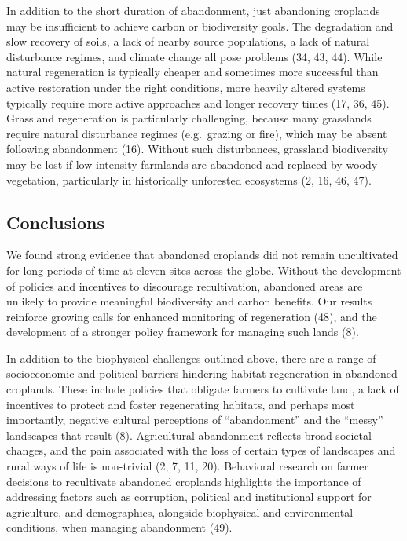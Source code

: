 \documentclass[9pt,twocolumn,twoside,lineno]{pnas-new}
\begin{document}
In addition to the short duration of abandonment, just abandoning croplands may be insufficient to achieve carbon or biodiversity goals.
The degradation and slow recovery of soils, a lack of nearby source populations, a lack of natural disturbance regimes, and climate change all pose problems (34, 43, 44).
While natural regeneration is typically cheaper and sometimes more successful than active restoration under the right conditions, more heavily altered systems typically require more active approaches and longer recovery times (17, 36, 45).
Grassland regeneration is particularly challenging, because many grasslands require natural disturbance regimes (e.g.~grazing or fire), which may be absent following abandonment (16).
Without such disturbances, grassland biodiversity may be lost if low-intensity farmlands are abandoned and replaced by woody vegetation, particularly in historically unforested ecosystems (2, 16, 46, 47).

\hypertarget{conclusions}{%
\subsection{Conclusions}\label{conclusions}}

We found strong evidence that abandoned croplands did not remain uncultivated for long periods of time at eleven sites across the globe.
Without the development of policies and incentives to discourage recultivation, abandoned areas are unlikely to provide meaningful biodiversity and carbon benefits.
Our results reinforce growing calls for enhanced monitoring of regeneration (48), and the development of a stronger policy framework for managing such lands (8).

In addition to the biophysical challenges outlined above, there are a range of socioeconomic and political barriers hindering habitat regeneration in abandoned croplands.
These include policies that obligate farmers to cultivate land, a lack of incentives to protect and foster regenerating habitats, and perhaps most importantly, negative cultural perceptions of ``abandonment'' and the ``messy'' landscapes that result (8).
Agricultural abandonment reflects broad societal changes, and the pain associated with the loss of certain types of landscapes and rural ways of life is non-trivial (2, 7, 11, 20).
Behavioral research on farmer decisions to recultivate abandoned croplands highlights the importance of addressing factors such as corruption, political and institutional support for agriculture, and demographics, alongside biophysical and environmental conditions, when managing abandonment (49).
\end{document}
